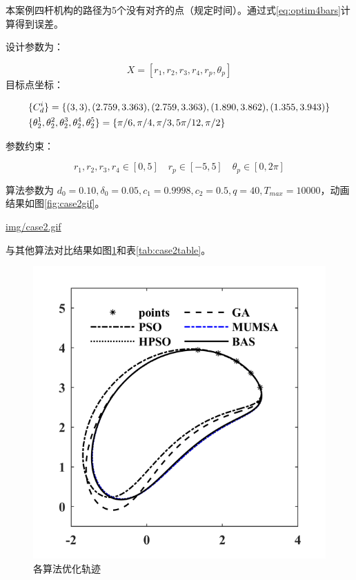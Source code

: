 \documentclass[]{ctexbook}
\theoremstyle{definition}
\theoremstyle{definition}
\theoremstyle{definition}
\theoremstyle{remark}
\begin{document}
本案例四杆机构的路径为5个没有对齐的点（规定时间）。通过式\eqref{eq:optim4bars}计算得到误差。

设计参数为：

\[
X = [r_1,r_2,r_3,r_4,r_p,\theta_p]
\] 目标点坐标：

\begin{align}
&\{C_d^i\} = \{(3,3),(2.759,3.363),(2.759,3.363),(1.890,3.862),(1.355,3.943)\} \notag \\
&\{\theta_2^1,\theta_2^2,\theta_2^3,\theta_2^4,\theta_2^5\}=\{\pi/6,\pi/4,\pi/3,5\pi/12,\pi/2\} \notag \\
\end{align}

参数约束：

\[
r_1,r_2,r_3,r_4\in[0,5]\quad r_p\in[-5,5]\quad \theta_p\in[0,2\pi]
\]

算法参数为
\(d_0 = 0.10,\delta_0=0.05,c_1=0.9998,c_2=0.5,q=40,T_{max}=10000\)，动画结果如图\ref{fig:case2gif}。

\url{img/case2.gif}

与其他算法对比结果如图\ref{fig:case2png}和表\ref{tab:case2table}。

\begin{figure}

{\centering \includegraphics[width=0.5\linewidth]{img/case2png} 

}

\caption{各算法优化轨迹}\label{fig:case2png}
\end{figure}
\end{document}
